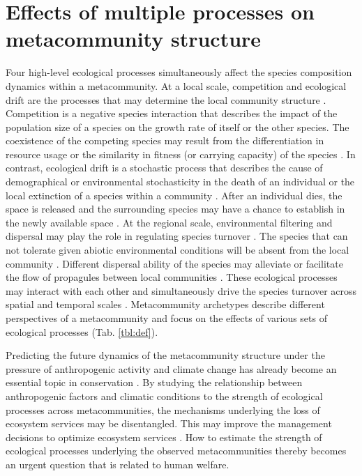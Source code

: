 \section{Effects of multiple processes on metacommunity structure}
\noindent
Four high-level ecological processes simultaneously affect the species composition dynamics within a metacommunity. At a local scale, competition and ecological drift are the processes that may determine the local community structure \citep{leibold2004metacommunity}. Competition is a negative species interaction that describes the impact of the population size of a species on the growth rate of itself or the other species. The coexistence of the competing species may result from the differentiation in resource usage or the similarity in fitness (or carrying capacity) of the species \citep{macarthur1967limiting, chesson2000mechanisms}. In contrast, ecological drift is a stochastic process that describes the cause of demographical or environmental stochasticity in the death of an individual or the local extinction of a species within a community \citep{hubbell2011unified}. After an individual dies, the space is released and the surrounding species may have a chance to establish in the newly available space \citep{fukami2015historical}. At the regional scale, environmental filtering and dispersal may play the role in regulating species turnover \citep{leibold2004metacommunity}. The species that can not tolerate given abiotic environmental conditions will be absent from the local community \citep{kraft2015community}. Different dispersal ability of the species may alleviate or facilitate the flow of propagules between local communities \citep{tilman1997community, macarthur1967theory}. These ecological processes may interact with each other and simultaneously drive the species turnover across spatial and temporal scales \citep{thompson2020process}. Metacommunity archetypes describe different perspectives of a metacommunity and focus on the effects of various sets of ecological processes \citep{leibold2004metacommunity, leibold2017metacommunity} (Tab. \ref{tbl:def}). 

Predicting the future dynamics of the metacommunity structure under the pressure of anthropogenic activity and climate change has already become an essential topic in conservation \citep{clark2001ecological, evans2012modelling, chase2020biodiversity}. By studying the relationship between anthropogenic factors and climatic conditions to the strength of ecological processes across metacommunities, the mechanisms underlying the loss of ecosystem services may be disentangled. This may improve the management decisions to optimize ecosystem services \citep{hodgson2019investigating, chase2020biodiversity}. How to estimate the strength of ecological processes underlying the observed metacommunities thereby becomes an urgent question that is related to human welfare.

